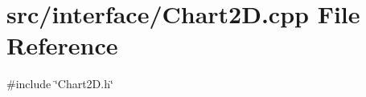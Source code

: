 \section{src/interface/\+Chart2D.cpp File Reference}
\label{_chart2_d_8cpp}
{\ttfamily \#include \char`\"{}Chart2\+D.\+h\char`\"{}}\newline
